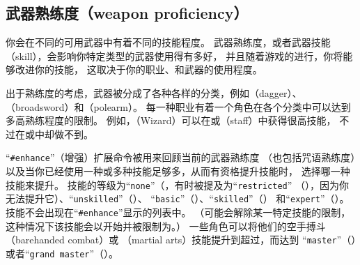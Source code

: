 \documentclass[a4paper, 10pt]{article}
\begin{document}
\subsection*{武器熟练度（weapon proficiency）}

你会在不同的可用武器中有着不同的技能程度。
武器熟练度，或者武器技能（skill），会影响你特定类型的武器使用得有多好，
并且随着游戏的进行，你将能够改进你的技能，
这取决于你的职业、\zhTransExperienceLevel{}和武器的使用程度。

出于熟练度的考虑，武器被分成了各种各样的分类，例如\zhTransDagger（dagger）、
\zhTransBroadsword（broadsword）和\zhTransPolearm（polearm）。
每一种职业有着一个角色在各个分类中可以达到多高熟练程度的限制。
例如，\zhTransWizards{}（Wizard）可以在\zhTransDagger{}或\zhTransStaff（staff）中获得很高技能，
不过在\zhTransSwords{}或\zhTransBow{}中却做不到。

“{\tt \#enhance}”（增强）扩展命令被用来回顾当前的武器熟练度
（也包括咒语熟练度）以及当你已经使用一种或多种技能足够多，从而有资格提升技能时，
选择哪一种技能来提升。
技能的等级为“{\tt none}”（\zhTransNone，有时被提及为“{\tt restricted}”
（\zhTransRestricted），因为你无法提升它）、“{\tt unskilled}”（\zhTransUnskilled）、
“{\tt basic}”（\zhTransBasic）、“{\tt skilled}”（\zhTransSkilled）
和“{\tt expert}”（\zhTransExpert）。
\zhTransRestricted{}技能不会出现在“{\tt \#enhance}”显示的列表中。
（\zhTransDivineIntervention{}可能会解除某一特定技能的限制，
这种情况下该技能会以\zhTransUnskilled{}开始并被限制为\zhTransBasic。）
一些角色可以将他们的空手搏斗（barehanded combat）或\zhTransMartialArts
（martial arts）技能提升到超过\zhTransExpert，而达到
“{\tt master}”（\zhTransMaster）或者“{\tt grand master}”（\zhTransGrandMaster）。
\end{document}
